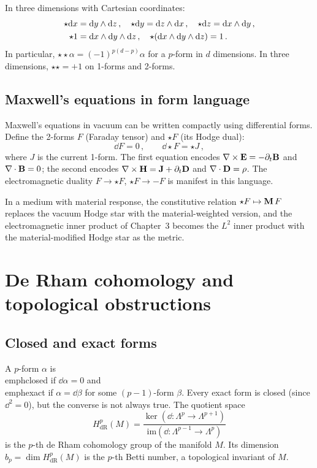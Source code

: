 In three dimensions with Cartesian coordinates:
\begin{align}
  \star\mathrm{d} x &= \mathrm{d} y\wedge\mathrm{d} z\,,\quad
  \star\mathrm{d} y = \mathrm{d} z\wedge\mathrm{d} x\,,\quad
  \star\mathrm{d} z = \mathrm{d} x\wedge\mathrm{d} y\,,\notag\\
  \star 1 &= \mathrm{d} x\wedge\mathrm{d} y\wedge\mathrm{d} z\,,\quad
  \star(\mathrm{d} x\wedge\mathrm{d} y\wedge\mathrm{d} z) = 1\,.
\end{align}
In particular, $\star\star\alpha=(-1)^{p(d-p)}\alpha$ for a $p$-form
in $d$ dimensions.  In three dimensions, $\star\star=+1$ on 1-forms
and 2-forms.

\subsection{Maxwell's equations in form language}
\label{sec:appB-maxwell-forms}

Maxwell's equations in vacuum can be written compactly using
differential forms.  Define the 2-forms $F$ (Faraday tensor) and
$\star F$ (its Hodge dual):
\begin{equation}\label{eq:appB-maxwell-forms}
  \dd F = 0\,,\qquad \dd\star F = \star J\,,
\end{equation}
where $J$ is the current 1-form.  The first equation encodes
$\nabla\times\mathbf{E}=-\partial_t\mathbf{B}$ and $\nabla\cdot\mathbf{B}=0$;
the second encodes $\nabla\times\mathbf{H}=\mathbf{J}+\partial_t\mathbf{D}$
and $\nabla\cdot\mathbf{D}=\rho$.  The electromagnetic duality
$F\to\star F$, $\star F\to -F$ is manifest in this language.

In a medium with material response, the constitutive relation
$\star F\mapsto\mathbf{M}\,F$ replaces the vacuum Hodge star with the
material-weighted version, and the electromagnetic inner product of
Chapter~3 becomes the $L^2$ inner product with the material-modified
Hodge star as the metric.

\section{De Rham cohomology and topological obstructions}
\label{sec:appB-derham}

\subsection{Closed and exact forms}
\label{sec:appB-closed-exact}

A $p$-form $\alpha$ is \\emph{closed} if $\dd\alpha=0$ and
\\emph{exact} if $\alpha=\dd\beta$ for some $(p-1)$-form $\beta$.
Every exact form is closed (since $\dd^2=0$), but the converse is
not always true.  The quotient space
\begin{equation}\label{eq:appB-derham-cohomology}
  H^p_{\mathrm{dR}}(M) = \frac{\ker(\dd:
  \Lambda^p\to\Lambda^{p+1})}
  {\mathrm{im}(\dd:\Lambda^{p-1}\to\Lambda^p)}
\end{equation}
is the $p$-th de Rham cohomology group of the manifold $M$.  Its
dimension $b_p=\dim H^p_{\mathrm{dR}}(M)$ is the $p$-th Betti
number, a topological invariant of $M$.

